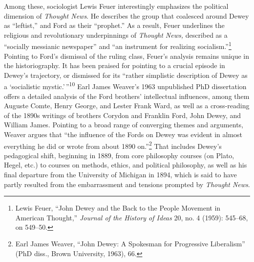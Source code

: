 \documentclass[twoside,symmetric,nobib,justified]{tufte-book}
\begin{document}
Among these, sociologist Lewis Feuer interestingly emphasizes the
political dimension of \emph{Thought News}. He describes the group that
coalesced around Dewey as ``leftist,'' and Ford as their ``prophet.'' As
a result, Feuer underlines the religious and revolutionary underpinnings
of \emph{Thought News,} described as a ``socially messianic newspaper''
and ``an instrument for realizing socialism.''\footnote{Lewis Feuer,
  ``John Dewey and the Back to the People Movement in American
  Thought,'' \emph{Journal of the History of Ideas} 20, no. 4 (1959):
  545--68, on 549--50.} Pointing to Ford's dismissal of the ruling
class, Feuer's analysis remains unique in the historiography. It has
been praised for pointing to a crucial episode in Dewey's trajectory, or
dismissed for its ``rather simplistic description of Dewey as a
`socialistic mystic.'\,''\textsuperscript{10} Earl James Weaver's 1963
unpublished PhD dissertation offers a detailed analysis of the Ford
brothers' intellectual influences, among them Auguste Comte, Henry
George, and Lester Frank Ward, as well as a cross-reading of the 1890s
writings of brothers Corydon and Franklin Ford, John Dewey, and William
James. Pointing to a broad range of converging themes and arguments,
Weaver argues that ``the influence of the Fords on Dewey was evident in
almost everything he did or wrote from about 1890 on.''\footnote{Earl
  James Weaver, ``John Dewey: A Spokesman for Progressive Liberalism''
  (PhD diss., Brown University, 1963), 66.} That includes Dewey's
pedagogical shift, beginning in 1889, from core philosophy courses (on
Plato, Hegel, etc.) to courses on methods, ethics, and political
philosophy, as well as his final departure from the University of
Michigan in 1894, which is said to have partly resulted from the
embarrassment and tensions prompted by \emph{Thought News}.
\end{document}

